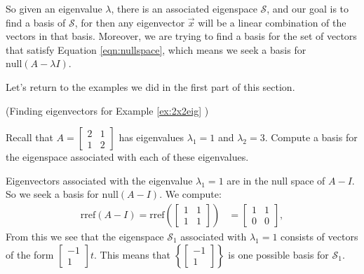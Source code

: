 \documentclass{ximera}
\begin{document}
So given an eigenvalue $\lambda$, there is an associated eigenspace $\mathcal{S}$, and our goal is to find a basis of $\mathcal{S}$, for then any eigenvector $\vec{x}$ will be a linear combination of the vectors in that basis.  Moreover, we are trying to find a basis for the set of vectors that satisfy Equation \ref{eqn:nullspace}, which means we seek a basis for $\mbox{null}(A-\lambda I)$. 
    
Let's return to the examples we did in the first part of this section.
    
\begin{example}\label{ex:eigvect2x2eig} (Finding eigenvectors for Example \ref{ex:2x2eig} )
    
Recall that $A=\begin{bmatrix} 2& 1\\ 1&2
\end{bmatrix}$ has eigenvalues $\lambda_1=1$ and $\lambda_2=3$.  Compute a basis for the eigenspace associated with each of these eigenvalues.
\begin{explanation}
Eigenvectors associated with the eigenvalue $\lambda_1=1$ are in the null space of $A-I$.  So we seek a basis for $\mbox{null}(A-I)$.  We compute:
\begin{align*}\mbox{rref}(A-I)=\mbox{rref}\left(\begin{bmatrix}1&1\\1&1\end{bmatrix}\right)&=\begin{bmatrix}1&1\\0&0\end{bmatrix},
\end{align*}
From this we see that the eigenspace $\mathcal{S}_1$ associated with $\lambda_1=1$ consists of vectors of the form $\begin{bmatrix}-1\\1\end{bmatrix}t$.
This means that $\left\{\begin{bmatrix}-1\\1\end{bmatrix}\right\}$ is one possible basis for $\mathcal{S}_1$.
    

\end{explanation}
\end{example}
\end{document}
